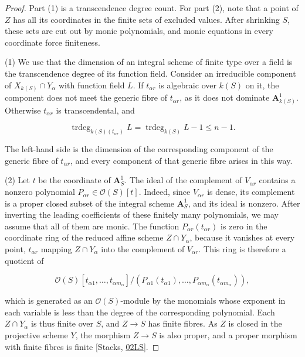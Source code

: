 \documentclass[11pt]{article}
\begin{document}
\begin{proof}[{Proof}]\label{bp554}%
Part (1) is a transcendence degree count. For part (2), note that a point of \(Z\) has all its coordinates in the finite sets of excluded values. After shrinking \(S\), these sets are cut out by monic polynomials, and monic equations in every coordinate force finiteness.

(1) We use that the dimension of an integral scheme of finite type over a field is the transcendence degree of its function field. Consider an irreducible component of \(X_{k(S)}\cap Y_\alpha\) with function field \(L\). If \(t_{\alpha r}\) is algebraic over \(k(S)\) on it, the component does not meet the generic fibre of \(t_{\alpha r}\), as it does not dominate \(\mathbf A^1_{k(S)}\). Otherwise \(t_{\alpha r}\) is transcendental, and

\[
\operatorname{trdeg}_{k(S)(t_{\alpha r})}L
=\operatorname{trdeg}_{k(S)} L-1\leq n-1.
\]

The left-hand side is the dimension of the corresponding component of the generic fibre of \(t_{\alpha r}\), and every component of that generic fibre arises in this way.

(2) Let \(t\) be the coordinate of \(\mathbf A^1_S\). The ideal of the complement of \(V_{\alpha r}\) contains a nonzero polynomial \(P_{\alpha r}\in\mathcal O(S)[t]\). Indeed, since \(V_{\alpha r}\) is dense, its complement is a proper closed subset of the integral scheme \(\mathbf A^1_S\), and its ideal is nonzero. After inverting the leading coefficients of these finitely many polynomials, we may assume that all of them are monic. The function \(P_{\alpha r}(t_{\alpha r})\) is zero in the coordinate ring of the reduced affine scheme \(Z\cap Y_\alpha\), because it vanishes at every point, \(t_{\alpha r}\) mapping \(Z\cap Y_\alpha\) into the complement of \(V_{\alpha r}\). This ring is therefore a quotient of

\[
\mathcal O(S)[t_{\alpha1},\ldots,t_{\alpha m_\alpha}]/
(P_{\alpha1}(t_{\alpha1}),\ldots,
P_{\alpha m_\alpha}(t_{\alpha m_\alpha})),
\]

which is generated as an \(\mathcal O(S)\)-module by the monomials whose exponent in each variable is less than the degree of the corresponding polynomial. Each \(Z\cap Y_\alpha\) is thus finite over \(S\), and \(Z\to S\) has finite fibres. As \(Z\) is closed in the projective scheme \(Y\), the morphism \(Z\to S\) is also proper, and a proper morphism with finite fibres is finite [Stacks, \href{https://stacks.math.columbia.edu/tag/02LS}{02LS}].
\end{proof}
\end{document}
